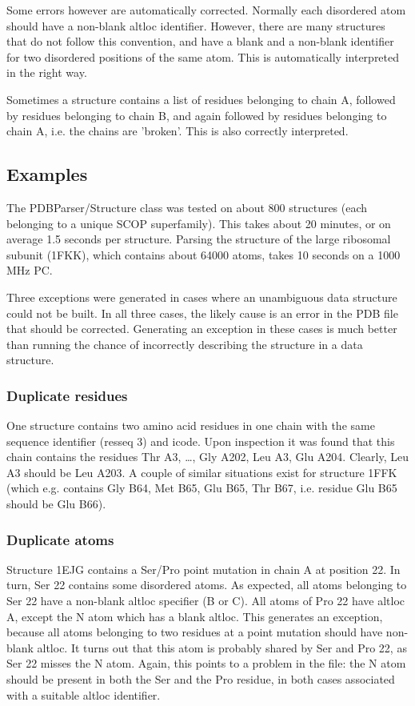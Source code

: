 \documentclass{report}
\begin{document}
Some errors however are automatically corrected. Normally each disordered
atom should have a non-blank altloc identifier. However, there are
many structures that do not follow this convention, and have a blank
and a non-blank identifier for two disordered positions of the same
atom. This is automatically interpreted in the right way.

Sometimes a structure contains a list of residues belonging to chain
A, followed by residues belonging to chain B, and again followed by
residues belonging to chain A, i.e. the chains are 'broken'. This
is also correctly interpreted.

\subsection{Examples\label{problem structures}}

The PDBParser/Structure class was tested on about 800 structures (each belonging
to a unique SCOP superfamily). This takes about 20 minutes, or on average 1.5
seconds per structure. Parsing the structure of the large ribosomal subunit
(1FKK), which contains about 64000 atoms, takes 10 seconds on a 1000 MHz PC.

Three exceptions were generated in cases where an unambiguous data structure
could not be built. In all three cases, the likely cause is an error in the
PDB file that should be corrected. Generating an exception in these cases
is much better than running the chance of incorrectly describing
the structure in a data structure.

\subsubsection{Duplicate residues}

One structure contains two amino acid residues in one chain with the same sequence
identifier (resseq 3) and icode. Upon inspection it was found that this chain
contains the residues Thr A3, \ldots, Gly A202, Leu A3, Glu A204. Clearly,
Leu A3 should be Leu A203. A couple of similar situations exist for structure
1FFK (which e.g. contains Gly B64, Met B65, Glu B65, Thr B67, i.e. residue Glu
B65 should be Glu B66).

\subsubsection{Duplicate atoms}

Structure 1EJG contains a Ser/Pro point mutation in chain A at position 22.
In turn, Ser 22 contains some disordered atoms. As expected, all atoms belonging
to Ser 22 have a non-blank altloc specifier (B or C). All atoms of Pro 22 have
altloc A, except the N atom which has a blank altloc. This generates an exception,
because all atoms belonging to two residues at a point mutation should have
non-blank altloc. It turns out that this atom is probably shared by Ser and
Pro 22, as Ser 22 misses the N atom. Again, this points to a problem in the
file: the N atom should be present in both the Ser and the Pro residue, in both
cases associated with a suitable altloc identifier.
\end{document}
